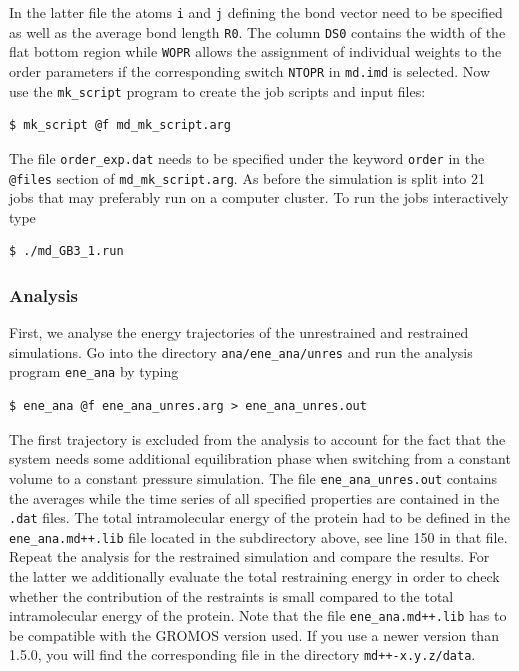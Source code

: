 In the latter file the atoms \texttt{i} and \texttt{j} defining the bond vector need to be specified as well as the average bond length \texttt{R0}. The column \texttt{DS0} contains the 
width of the flat bottom region while \texttt{WOPR} allows the assignment of individual weights to the order parameters if the corresponding switch \texttt{NTOPR} in \texttt{md.imd}
is selected. Now use the \texttt{mk\_script} program to create the job scripts and input files:
\begin{lstlisting}
$ mk_script @f md_mk_script.arg
\end{lstlisting}
The file \texttt{order\_exp.dat} needs to be specified under the keyword \texttt{order} in the \texttt{@files} section of \texttt{md\_mk\_script.arg}.
As before the simulation is split into 21 jobs that may preferably run on a computer cluster. To run the jobs interactively type
\begin{lstlisting}
$ ./md_GB3_1.run
\end{lstlisting}

\subsubsection{Analysis}
First, we analyse the energy trajectories of the unrestrained and restrained simulations. Go into the directory \texttt{ana/ene\_ana/unres} and run the analysis program \texttt{ene\_ana} by typing
\begin{lstlisting}
$ ene_ana @f ene_ana_unres.arg > ene_ana_unres.out
\end{lstlisting}
The first trajectory is excluded from the analysis to account for the fact that the system needs some additional equilibration phase when switching from a constant volume to a constant pressure simulation.
The file \texttt{ene\_ana\_unres.out} contains the averages while the time series of all specified properties are contained in the \texttt{.dat} files. The total intramolecular energy of the protein 
had to be defined in the \texttt{ene\_ana.md++.lib} file located in the subdirectory above, see line 150 in that file. Repeat the analysis for the restrained simulation and compare the results. For the latter we additionally 
evaluate the total restraining energy in order to check whether the contribution of the restraints is small compared to the total intramolecular energy of the protein. 
Note that the file \texttt{ene\_ana.md++.lib} has to be compatible with the GROMOS version used. If you use a newer version than 1.5.0, you will find the corresponding file in the directory \texttt{md++-x.y.z/data}.

